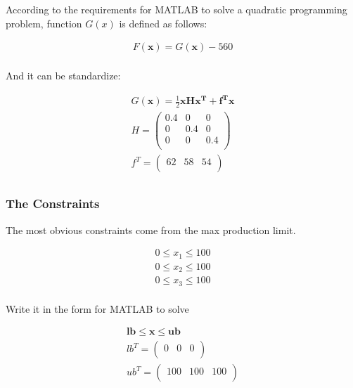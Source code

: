 \documentclass[12pt]{article}
\begin{document}
According to the requirements for MATLAB to solve a quadratic programming problem, function $G(x)$ is defined as follows:

\begin{equation}
\begin{aligned}
	F(\mathbf{x})=G(\mathbf{x})-560  \\
\end{aligned}
\end{equation}

And it can be standardize:

\begin{equation}
\begin{aligned}
		G(\mathbf{x})=\frac{1}{2}\mathbf{x}\mathbf{H}\mathbf{x^T}+ \mathbf{f^T}\mathbf{x} \\
	H=\left(   
	\begin{array}{ccc} 
		0.4 & 0 & 0\\
		0 & 0.4 & 0\\ 
		0 & 0 & 0.4\\ 
	\end{array}
	\right) \\
	f^T=\left(   
	\begin{array}{ccc} 
		62 & 58 & 54\\
	\end{array}
	\right) \\
\end{aligned}
\end{equation}

\subsubsection{The Constraints}

The most obvious constraints come from the max production limit.

\begin{equation}
	\begin{aligned}
	0 \le x_1 \le 100 \\
	0 \le x_2 \le 100 \\
	0 \le x_3 \le 100 \\
	\end{aligned}
\end{equation}

Write it in the form for MATLAB to solve

\begin{equation}
\begin{aligned}
	\mathbf{lb} \le \mathbf{x} \le \mathbf{ub} \\
	lb^T=\left(   
	\begin{array}{ccc} 
		0 & 0 & 0\\
	\end{array}
	\right) \\
	ub^T=\left(   
	\begin{array}{ccc} 
		100 & 100 & 100\\
	\end{array}
	\right) \\
\end{aligned}
\end{equation}
\end{document}
